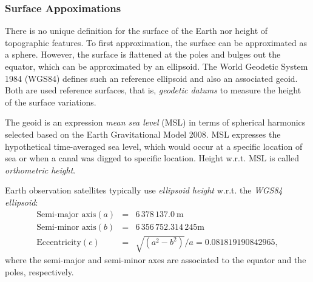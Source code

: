 \documentclass [12pt, a4paper] {article}
\begin{document}
\subsubsection{Surface Appoximations}
There is no unique definition for the surface of the Earth nor height of topographic features.
To first approximation, the surface can be approximated as a sphere. However, the surface 
is flattened at the poles and bulges out the equator, which can be approximated by an ellipsoid. 
The World Geodetic System 1984 (WGS84) defines such an reference 
ellipsoid and also an associated geoid. Both are used reference surfaces, that is,  
\emph{geodetic datums} to measure the height of the surface variations. 

The geoid is an expression \emph{mean sea level} (MSL) in terms of spherical harmonics selected 
based on the Earth Gravitational Model 2008. MSL expresses the hypothetical time-averaged sea level, 
which would occur at a specific location of sea or when a canal was digged to specific location. 
Height w.r.t. MSL is called \emph{orthometric height}. 

Earth observation satellites typically use \emph{ellipsoid height} w.r.t. the \emph{WGS84 ellipsoid}:
\begin {eqnarray}
\textrm{Semi-major axis}(a) &=& 6\,378\,137.0\:\textrm{m} \\
\textrm{Semi-minor axis}(b) &=& 6\,356\,752.314\,245\textrm{m} \\
\textrm{Eccentricity}(e) &=& \sqrt{(a^2 - b^2)}/a = 0.081819190842965,
\end {eqnarray}
where the semi-major and semi-minor axes are associated to the equator and the poles, respectively.
\end{document}
